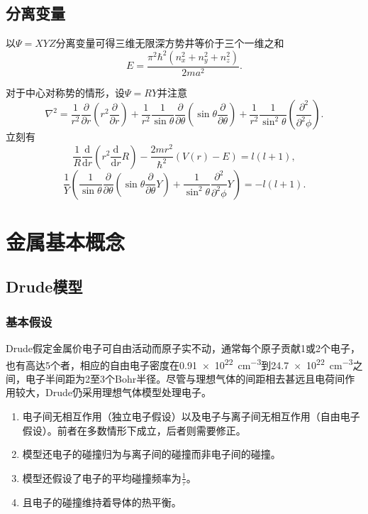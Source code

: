 \documentclass{ctexart}
\newcommand{\ddel}[1]{\frac{\partial}{\partial #1}}
\newcommand{\dddel}[1]{\frac{\partial^2}{\partial^2 #1}}
\newcommand{\ddr}{\ddel{r}}
\newcommand{\ddth}{\ddel{\theta}}
\newcommand{\dddph}{\dddel{\phi}}
\newcommand{\edd}[1]{\frac{\mathrm{d}}{\mathrm{d} #1}}
\newcommand{\edr}{\edd{r}}
\newcommand{\pare}[1]{\left( #1 \right)}
\newcommand{\lapc}{\nabla^2}
\newcommand{\rec}[1]{\frac{1}{#1}}
\begin{document}
\subsection{分离变量}
以$\Psi=XYZ$分离变量可得三维无限深方势井等价于三个一维之和
\begin{equation}
\label{eq:3dw}
E = \frac{\pi^2\hbar^2\pare{n_x^2+n_y^2+n_z^2}}{2ma^2}.
\end{equation}
\par
对于中心对称势的情形，设$\Psi=RY$并注意
\[ \lapc = \rec{r^2}\ddr\pare{r^2\ddr} + \rec{r^2}\rec{\sin\theta}\ddth\pare{\sin\theta\ddth} + \rec{r^2}\rec{\sin^2\theta}\pare{\dddph}. \]
立刻有
\[ \rec{R}\edr\pare{r^2\edr{R}} - \frac{2mr^2}{\hbar^2}\pare{V\pare{r}-E} = l\pare{l+1}, \]
\[ \rec{Y}\pare{\rec{\sin\theta}\ddth\pare{\sin\theta\ddth Y} + \rec{\sin^2\theta}\dddph Y} = -l\pare{l+1}. \]

\newpage
\section{金属基本概念}
\subsection{Drude模型}
\subsubsection{基本假设}
Drude假定金属价电子可自由活动而原子实不动，通常每个原子贡献1或2个电子，也有高达5个者，相应的自由电子密度在\SI{0.91e22}{\cm^{-3}}到\-\SI{24.7e22}{\cm^{-3}}之间，电子半间距为2至3个Bohr半径。尽管与理想气体的间距相去甚远且电荷间作用较大，Drude仍采用理想气体模型处理电子。
\par
\begin{enumerate}
\item 电子间无相互作用（独立电子假设）以及电子与离子间无相互作用（自由电子假设）。前者在多数情形下成立，后者则需要修正。
\item 模型还电子的碰撞归为与离子间的碰撞而非电子间的碰撞。
\item 模型还假设了电子的平均碰撞频率为$\rec{\tau}$。
\item 且电子的碰撞维持着导体的热平衡。
\end{enumerate}
\end{document}
